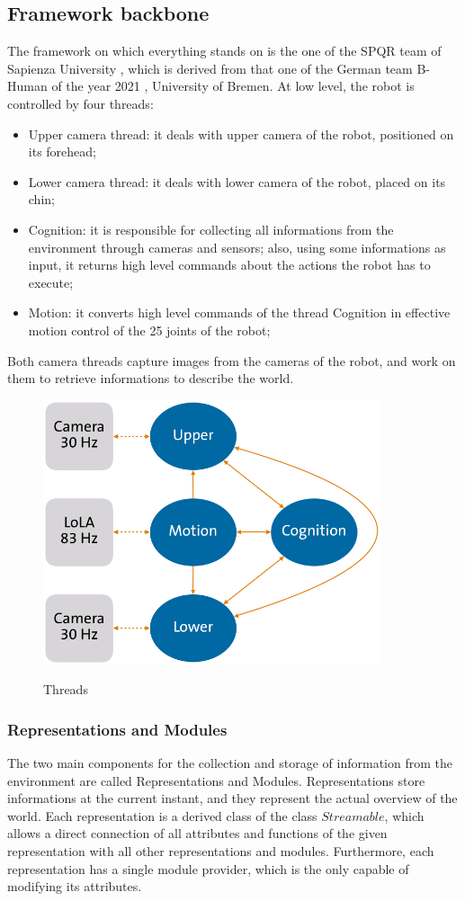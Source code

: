 \documentclass[a4paper, onecolumn, 12pt]{article}
\begin{document}
\subsection{Framework backbone}
\label{sec:framework}
The framework on which everything stands on is the one of the SPQR team of Sapienza University \cite{},
which is derived from that one of the
German team B-Human of the year 2021 \cite{bhuman2023}, University of Bremen. At low level, the robot is 
controlled by four threads:
\begin{itemize}
    \item Upper camera thread: it deals with upper camera of the robot, positioned on its forehead;
    \item Lower camera thread: it deals with lower camera of the robot, placed on its chin;
    \item Cognition: it is responsible for collecting all informations from the 
    environment through cameras and sensors; also, using some informations as input,
    it returns high level commands about the actions the robot has to execute;
    \item Motion: it converts high level commands of the thread Cognition in effective
    motion control of the 25 joints of the robot;
\end{itemize}
Both camera threads capture images from the cameras of the robot, and work on them 
to retrieve informations to describe the world.

\begin{figure}
    \centering
    \includegraphics[width=0.5\linewidth]{assets/threads.png}
    \label{fig:threads}
    \caption{Threads}
\end{figure}

\subsubsection{Representations and Modules}
The two main components for the collection and storage of information from the environment
are called Representations and Modules.
Representations store informations at the current instant, and they represent the actual overview
of the world. Each representation is a derived class of the class $Streamable$, which allows a 
direct connection of all attributes and functions of the given representation with all other
representations and modules. Furthermore, each representation has a single module provider, which
is the only capable of modifying its attributes.
\end{document}
